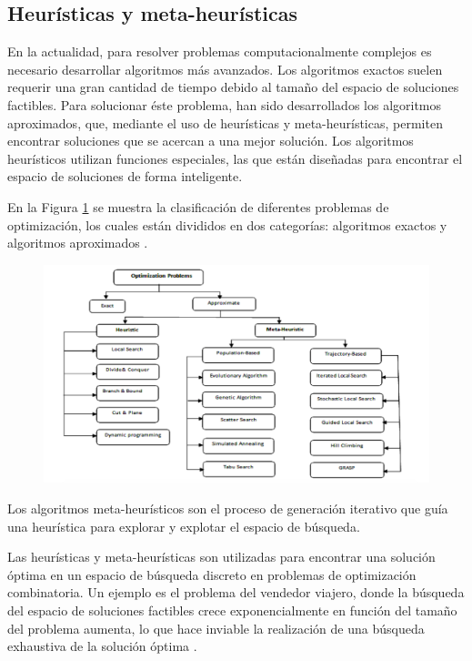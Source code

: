 \subsection{Heurísticas y meta-heurísticas}

En la actualidad, para resolver problemas computacionalmente complejos es necesario desarrollar algoritmos más avanzados. Los algoritmos exactos suelen requerir una gran cantidad de tiempo debido al tamaño del espacio de soluciones factibles. Para solucionar éste problema, han sido desarrollados los algoritmos aproximados, que, mediante el uso de heurísticas y meta-heurísticas, permiten encontrar soluciones que se acercan a una mejor solución. Los algoritmos heurísticos utilizan funciones especiales, las que están diseñadas para encontrar el espacio de soluciones de forma inteligente.



En la Figura \ref{fig:tax_opt} se muestra la clasificación de diferentes problemas de optimización, los cuales están divididos en dos categorías: algoritmos exactos y algoritmos aproximados \citep{desale_2015}.

\begin{figure}[H]
    \centering
    \includegraphics[width=16cm]{images/cap2/tax_opt.png}
    \label{fig:tax_opt}
\end{figure}


Los algoritmos meta-heurísticos son el proceso de generación iterativo que guía una heurística para explorar y explotar el espacio de búsqueda.

Las heurísticas y meta-heurísticas son utilizadas para encontrar una solución óptima en un espacio de búsqueda discreto en problemas de optimización combinatoria. Un ejemplo es el problema del vendedor viajero, donde la búsqueda del espacio de soluciones factibles crece exponencialmente en función del tamaño del problema aumenta, lo que hace inviable la realización de una búsqueda exhaustiva de la solución óptima \citep{desale_2015}.


